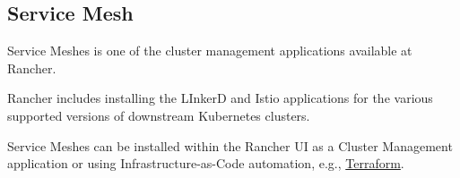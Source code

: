 \subsection{Service Mesh}

Service Meshes is one of the cluster management applications available at Rancher.

Rancher includes installing the LInkerD and Istio applications for the various supported versions of downstream Kubernetes clusters.

Service Meshes can be installed within the Rancher UI as a Cluster Management application or using Infrastructure-as-Code automation, e.g., \href{https://www.terraform.io/}{Terraform}.
